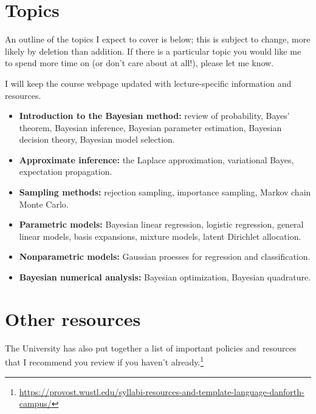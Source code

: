 \documentclass{article}
\begin{document}
\section*{Topics}

An outline of the topics I expect to cover is below; this is subject to change,
more likely by deletion than addition.  If there is a particular topic you would
like me to spend more time on (or don't care about at all!), please let me know.

I will keep the course webpage updated with lecture-specific information and
resources.

\begin{itemize}
\item \textbf{Introduction to the Bayesian method:} review of probability,
  Bayes' theorem, Bayesian inference, Bayesian parameter estimation, Bayesian
  decision theory, Bayesian model selection.
\item \textbf{Approximate inference:} the Laplace approximation, variational
  Bayes, expectation propagation.
\item \textbf{Sampling methods:} rejection sampling, importance sampling, Markov
  chain Monte Carlo.
\item \textbf{Parametric models:} Bayesian linear regression, logistic
  regression, general linear models, basis expansions, mixture models, latent
  Dirichlet allocation.
\item \textbf{Nonparametric models:} Gaussian proesses for regression and
  classification.
\item \textbf{Bayesian numerical analysis:} Bayesian optimization, Bayesian
  quadrature.
\end{itemize}

\section*{Other resources}

The University has also put together a list of important policies and resources
that I recommend you review if you haven't already.\footnote{\url{https://provost.wustl.edu/syllabi-resources-and-template-language-danforth-campus/}}
\end{document}

